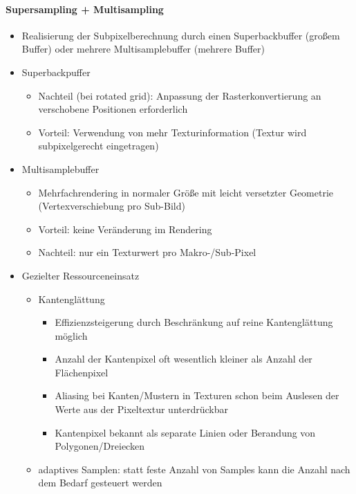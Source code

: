 \documentclass[10pt,landscape]{article}
\begin{document}
\begin{multicols}{3}
  \paragraph{Supersampling + Multisampling}
  \begin{itemize}
    \item Realisierung der Subpixelberechnung durch einen Superbackbuffer (großem Buffer) oder mehrere Multisamplebuffer (mehrere Buffer)
    \item Superbackpuffer
          \begin{itemize}
            \item Nachteil (bei rotated grid): Anpassung der Rasterkonvertierung an verschobene Positionen erforderlich
            \item Vorteil: Verwendung von mehr Texturinformation (Textur wird subpixelgerecht eingetragen)
          \end{itemize}
    \item Multisamplebuffer
          \begin{itemize}
            \item Mehrfachrendering in normaler Größe mit leicht versetzter Geometrie (Vertexverschiebung pro Sub-Bild)
            \item Vorteil: keine Veränderung im Rendering
            \item Nachteil: nur ein Texturwert pro Makro-/Sub-Pixel
          \end{itemize}
    \item Gezielter Ressourceneinsatz
          \begin{itemize} 
            \item Kantenglättung
                  \begin{itemize} 
                    \item Effizienzsteigerung durch Beschränkung auf reine Kantenglättung möglich
                    \item Anzahl der Kantenpixel oft wesentlich kleiner als Anzahl der Flächenpixel
                    \item Aliasing bei Kanten/Mustern in Texturen schon beim Auslesen der Werte aus der Pixeltextur unterdrückbar
                    \item Kantenpixel bekannt als separate Linien oder Berandung von Polygonen/Dreiecken
                  \end{itemize}
            \item adaptives Samplen: statt feste Anzahl von Samples kann die Anzahl nach dem Bedarf gesteuert werden
          \end{itemize}
  \end{itemize}
  

\end{multicols}
\end{document}
